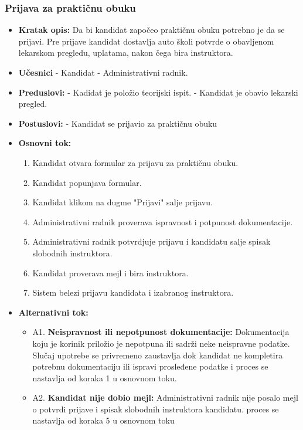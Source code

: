 \subsubsection{Prijava za praktičnu obuku}

\vspace{3mm}

\begin{itemize}

\item \textbf{Kratak opis:} Da bi kandidat započeo praktičnu obuku potrebno je da se prijavi. Pre prijave kandidat dostavlja auto školi potvrde o obavljenom lekarskom pregledu, uplatama, nakon čega bira instruktora.

\vspace{2mm}

\item \textbf{Učesnici} \newline
   - Kandidat \newline 
   - Administrativni radnik.

\item \textbf{Preduslovi:} \newline
   - Kadidat je položio teorijski ispit. \newline 
   - Kandidat je obavio lekarski pregled. 

\item \textbf{Postuslovi:} \newline
    - Kandidat se prijavio za praktičnu obuku 

\item \textbf{Osnovni tok:}  
   \begin{enumerate}
   \item Kandidat otvara formular za prijavu za praktičnu obuku.
   \item Kandidat popunjava formular.
   \item Kandidat klikom na dugme "Prijavi" salje prijavu.
   \item Administrativni radnik proverava ispravnost i potpunost dokumentacije.
   \item Administrativni radnik potvrdjuje prijavu i kandidatu salje spisak slobodnih instruktora.
   \item Kandidat proverava mejl i bira instruktora.
   \item Sistem belezi prijavu kandidata i izabranog instruktora.
   \end{enumerate}

\item \textbf{Alternativni tok:}  
   \begin{itemize}
   \item A1. \textbf{Neispravnost ili nepotpunost dokumentacije:}
  Dokumentacija koju je korinik priložio je nepotpuna ili sadrži neke neispravne podatke. Slučaj upotrebe se privremeno zaustavlja dok kandidat ne kompletira potrebnu dokumentaciju ili ispravi prosleđene podatke i proces se nastavlja od koraka 1 u osnovnom toku.
  \item A2. \textbf{Kandidat nije dobio mejl:}
  Administrativni radnik nije posalo mejl o potvrdi prijave i spisak slobodnih instruktora kandidatu. proces se nastavlja od koraka 5 u osnovnom toku
   \end{itemize}

\end{itemize}  
